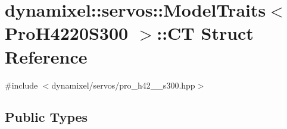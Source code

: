 \hypertarget{structdynamixel_1_1servos_1_1_model_traits_3_01_pro_h4220_s300_01_4_1_1_c_t}{}\section{dynamixel\+:\+:servos\+:\+:Model\+Traits$<$ Pro\+H4220\+S300 $>$\+:\+:C\+T Struct Reference}
\label{structdynamixel_1_1servos_1_1_model_traits_3_01_pro_h4220_s300_01_4_1_1_c_t}


{\ttfamily \#include $<$dynamixel/servos/pro\+\_\+h42\+\_\+\_\+s300.\+hpp$>$}

\subsection*{Public Types}

